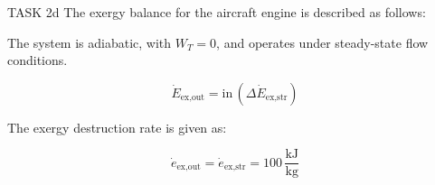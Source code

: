 TASK 2d  
The exergy balance for the aircraft engine is described as follows:  

The system is adiabatic, with \( W_T = 0 \), and operates under steady-state flow conditions.  

\[
\dot{E}_{\text{ex,out}} = \text{in} \, (\Delta \dot{E}_{\text{ex,str}})
\]

The exergy destruction rate is given as:  

\[
\dot{e}_{\text{ex,out}} = \dot{e}_{\text{ex,str}} = 100 \, \frac{\text{kJ}}{\text{kg}}
\]